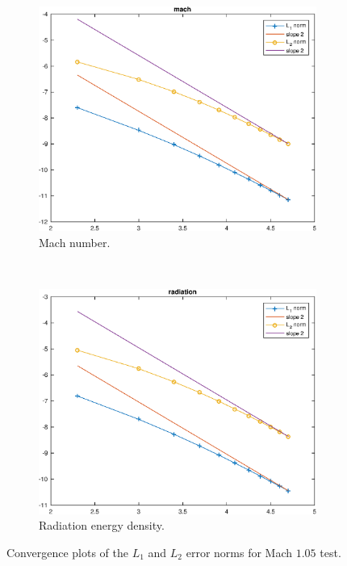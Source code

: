 \documentclass[times,doublespace]{fldauth}%
\begin{document}
\begin{figure}[H]
    \begin{subfigure}{0.5\textwidth}
    \centering
    \includegraphics[width=\linewidth]{figures/cst-xs/mach_1p05_mach_spline.eps}
    \caption{Mach number.}\label{fig:mach-1p05-cst-xs-mach}
    \end{subfigure}
    ~
    \begin{subfigure}{0.5\textwidth}
    \centering
    \includegraphics[width=\linewidth]{figures/cst-xs/mach_1p05_radiation_spline.eps}
    \caption{Radiation energy density.}\label{fig:mach-1p05-cst-xs-radiation}
    \end{subfigure}        
\caption{Convergence plots of the $L_1$ and $L_2$ error norms for Mach $1.05$ test.}\label{fig:mach-1p05-cst-xs}    
\end{figure}
%
%
\end{document}
